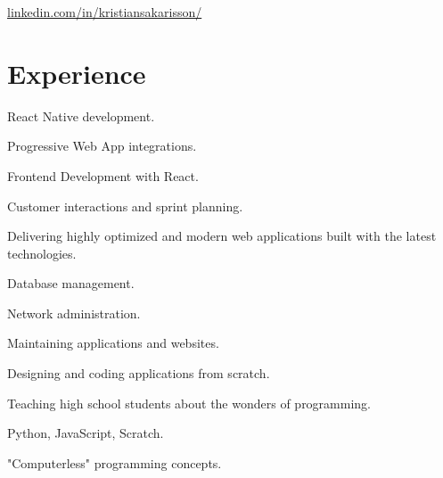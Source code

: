 \documentclass[]{deedy-resume-openfont}
\begin{document}

\href{https://www.linkedin.com/in/kristiansakarisson/}{linkedin.com/in/kristiansakarisson/}

\section{Experience}

\begin{tightemize}
\item React Native development.
\end{tightemize}
\sectionsep

\begin{tightemize}
\item Progressive Web App integrations.
\item Frontend Development with React.
\item Customer interactions and sprint planning.
\item Delivering highly optimized and modern web applications built with the latest technologies.
\end{tightemize}
\sectionsep

\begin{tightemize}
\item Database management.
\item Network administration.
\item Maintaining applications and websites.
\item Designing and coding applications from scratch.
\end{tightemize}
\sectionsep

\begin{tightemize}
\item Teaching high school students about the wonders of programming.
\item Python, JavaScript, Scratch.
\item "Computerless" programming concepts.
\end{tightemize}
\sectionsep
\end{document}
